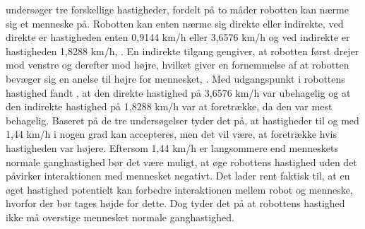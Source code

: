 \textcite[ss. 192-103]{PDF:PsychologicalEffects} undersøger tre forskellige hastigheder, fordelt på to måder robotten kan nærme sig et menneske på. Robotten kan enten nærme sig direkte eller indirekte, ved direkte er hastigheden enten 0,9144 km/h eller 3,6576 km/h og ved indirekte er hastigheden 1,8288 km/h, \parencite[ss. 192-103]{PDF:PsychologicalEffects}. En indirekte tilgang gengiver, at robotten først drejer mod venstre og derefter mod højre, hvilket giver en fornemmelse af at robotten bevæger sig en anelse til højre for mennesket, \parencite[s. 193]{PDF:PsychologicalEffects}. Med udgangspunkt i robottens hastighed fandt \textcite[s. 196]{PDF:PsychologicalEffects}, at den direkte hastighed på 3,6576 km/h var ubehagelig og at den indirekte hastighed på 1,8288 km/h var at foretrække, da den var mest behagelig. \blankline  
%
Baseret på de tre undersøgelser tyder det på, at hastigheder til og med 1,44 km/h i nogen grad kan accepteres, men det vil være, at foretrække hvis hastigheden var højere. Eftersom 1,44 km/h er langsommere end menneskets normale ganghastighed bør det være muligt, at øge robottens hastighed uden det påvirker interaktionen med mennesket negativt. Det lader rent faktisk til, at en øget hastighed potentielt kan forbedre interaktionen mellem robot og menneske, hvorfor der bør tages højde for dette. Dog tyder det på at robottens hastighed ikke må overstige mennesket normale ganghastighed.       
%


